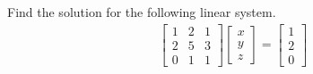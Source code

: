 \begin{exmp}
\label{exmp:mulsol}
Find the solution for the following linear system.
\begin{align*}
\begin{bmatrix}
1 & 2 & 1 \\
2 & 5 & 3 \\
0 & 1 & 1 
\end{bmatrix}
\begin{bmatrix}
x \\
y \\
z
\end{bmatrix}
=
\begin{bmatrix}
1 \\
2 \\
0
\end{bmatrix}   
\end{align*}
\end{exmp}
